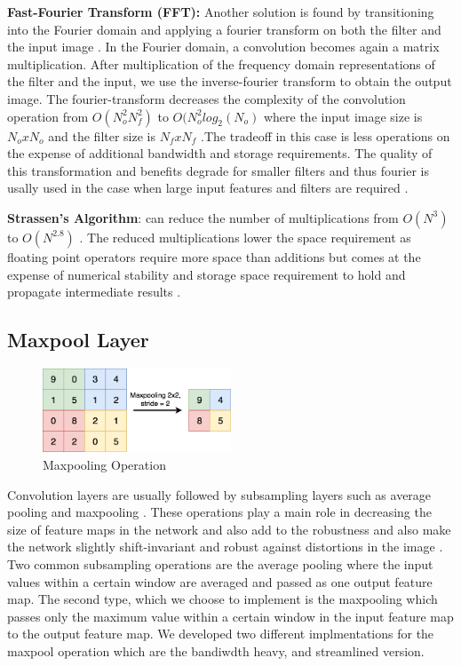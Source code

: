 \textbf{Fast-Fourier Transform (FFT):} Another solution is found by transitioning into the Fourier domain and applying a fourier transform on both the filter and the input image \cite{vasilache2014fast}. In the Fourier domain, a convolution becomes again a matrix multiplication. After multiplication of the frequency domain representations of the filter and the input, we use the inverse-fourier transform to obtain the output image. The fourier-transform decreases the complexity of the convolution operation from $ O(N_o^2N_f^2) $ to $ O(N_o^2log_2(N_o) $ where the input image size is $ N_oxN_o$ and the filter size is $ N_fxN_f $ .The tradeoff in this case is less operations on the expense of additional bandwidth and storage requirements. The quality of this transformation and benefits degrade for smaller filters and thus fourier is usally used in the case when large input features and filters are required \cite{sze2017efficient}. 

\textbf{Strassen's Algorithm}\cite{cong2014minimizing}: can reduce the number of multiplications from $O(N^3)$ to $O(N^{2.8})$\cite{sze2017efficient} . The reduced multiplications lower the space requirement as floating point operators require more space than additions but comes at the expense of numerical stability and storage space requirement to hold and propagate intermediate results \cite{sze2017efficient}.

\subsection{Maxpool Layer}

\begin{figure}[h!]
\centering
\includegraphics[width=0.5\textwidth]{Figures/maxpool}
\decoRule
\caption[maxpool]{ Maxpooling Operation}
\label{fig:maxpool}
\end{figure}

Convolution layers are usually followed by subsampling layers such as average pooling and maxpooling \cite{lenet}. These operations play a main role in decreasing the size of feature maps in the network and also add to the robustness and also make the network slightly shift-invariant and robust against distortions in the image \cite{alexnet}. Two common subsampling operations are the average pooling where the input values within a certain window are averaged and passed as one output feature map. The second type, which we choose to implement is the maxpooling which passes only the maximum value within a certain window in the input feature map to the output feature map. We developed two different implmentations for the maxpool operation which are the bandiwdth heavy, and streamlined version. 

